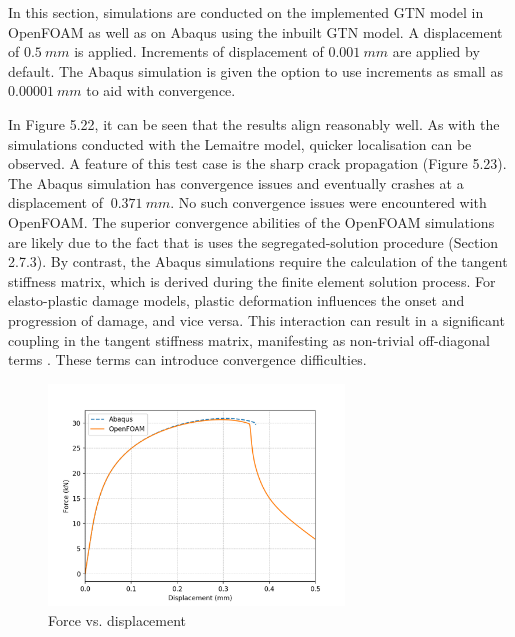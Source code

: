 \documentclass[sn-mathphys,Numbered,draft]{sn-jnl}%
\begin{document}
In this section, simulations are conducted on the implemented GTN model in OpenFOAM as well as on Abaqus using the inbuilt GTN model. A displacement of $0.5\ mm$ is applied. Increments of displacement of $0.001\ mm$ are applied by default. The Abaqus simulation is given the option to use increments as small as $0.00001\ mm$ to aid with convergence. 

In Figure 5.22, it can be seen that the results align reasonably well. As with the simulations conducted with the Lemaitre model, quicker localisation can be observed. A feature of this test case is the sharp crack propagation (Figure 5.23). The Abaqus simulation has convergence issues and eventually crashes at a displacement of $~0.371\ mm$. No such convergence issues were encountered with OpenFOAM. The superior convergence abilities of the OpenFOAM simulations are likely due to the fact that is uses the segregated-solution procedure (Section 2.7.3). By contrast, the Abaqus simulations require the calculation of the tangent stiffness matrix, which is derived during the finite element solution process. For elasto-plastic damage models, plastic deformation influences the onset and progression of damage, and vice versa. This interaction can result in a significant coupling in the tangent stiffness matrix, manifesting as non-trivial off-diagonal terms \cite{bathe_finite_1996}. These terms can introduce convergence difficulties.

\begin{figure}[htb]
\begin{center}
	\includegraphics[width=0.7\textwidth]{./Figures/GTNCompare/forceDispGTN.jpg}
\caption{Force vs. displacement}
\label{fig:notchedRoundBAr}
\end{center}
\end{figure}
\end{document}
